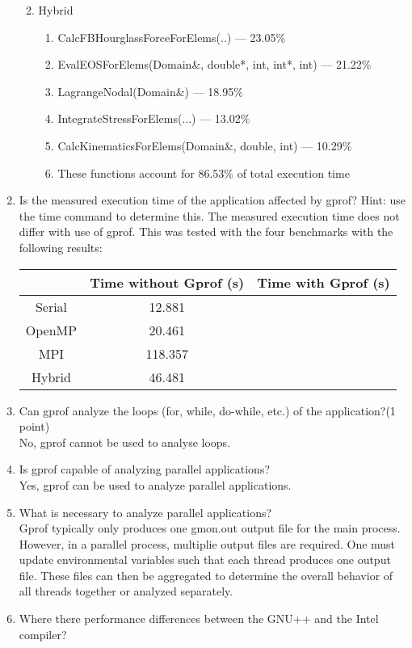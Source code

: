 \documentclass{article}
\begin{document}
\begin{enumerate}
\begin{enumerate}
\begin{enumerate}
	\end{enumerate}
	\item{Hybrid}
	\begin{enumerate}
		\item{CalcFBHourglassForceForElems(..) --- 23.05\%}											\item{EvalEOSForElems(Domain&, double*, int, int*, int) --- 21.22\%}
		\item{LagrangeNodal(Domain&) --- 18.95\%}
		\item{IntegrateStressForElems(...) --- 13.02\%}
		\item{CalcKinematicsForElems(Domain&, double, int) --- 10.29\%}
		\item{These functions account for 86.53\% of total execution time}
	\end{enumerate}
\end{enumerate}
\item{Is the measured execution time of the application affected by gprof? Hint: use the time command to determine this.}
The measured execution time does not differ with use of gprof. This was tested with the four benchmarks with the following results:
\begin{center}
\begin{tabular}{|c|c|c|}
\hline
&Time without Gprof (s) & Time with Gprof (s)\\
\hline
Serial &12.881&\\ \hline
OpenMP &20.461&\\ \hline
MPI &118.357&\\ \hline
Hybrid &46.481&\\ \hline
\end{tabular}
\end{center}
\item{Can gprof analyze the loops (for, while, do-while, etc.) of the application?(1 point)}\\
No, gprof cannot be used to analyse loops.
\item{Is gprof capable of analyzing parallel applications?}\\
Yes, gprof can be used to analyze parallel applications.
\item{What is necessary to analyze parallel applications?}\\
Gprof typically only produces one gmon.out output file for the main process. However, in a parallel process, multiplie output files are required. One must update environmental variables such that each thread produces one output file. These files can then be aggregated to determine the overall behavior of all threads together or analyzed separately.
\item{Where there performance differences between the GNU++ and the Intel compiler?}

\end{enumerate}
\end{document}
